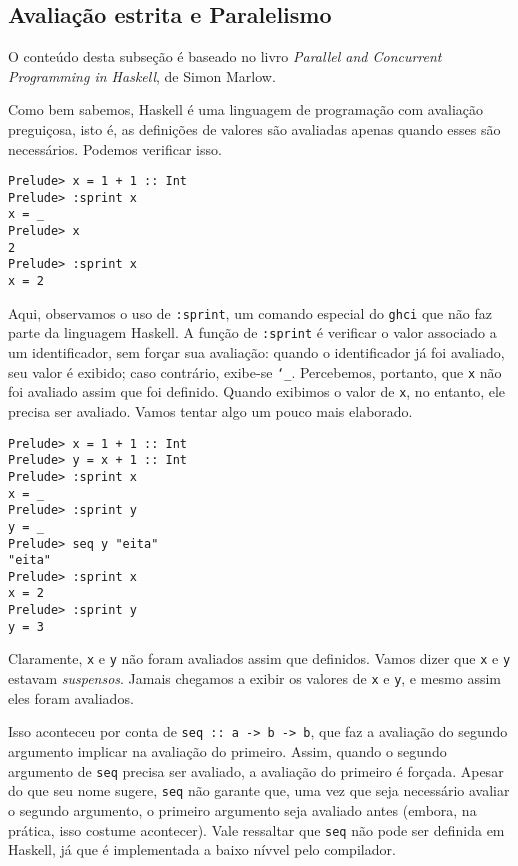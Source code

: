 \documentclass[a4paper]{article}
\begin{document}
\subsection{Avaliação estrita e Paralelismo}

\epigraph{O conteúdo desta subseção é baseado no livro \emph{Parallel and Concurrent Programming in Haskell}, de Simon Marlow.}{}

Como bem sabemos, Haskell é uma linguagem de programação com avaliação preguiçosa, isto é, as definições de valores são avaliadas apenas quando esses são necessários.
Podemos verificar isso.

\begin{verbatim}
Prelude> x = 1 + 1 :: Int
Prelude> :sprint x
x = _
Prelude> x
2
Prelude> :sprint x
x = 2
\end{verbatim}

Aqui, observamos o uso de \texttt{:sprint}, um comando especial do \texttt{ghci} que não faz parte da linguagem Haskell.
A função de \texttt{:sprint} é verificar o valor associado a um identificador, sem forçar sua avaliação: quando o identificador já foi avaliado, seu valor é exibido; caso contrário, exibe-se \texttt{\char`_}.
Percebemos, portanto, que \texttt{x} não foi avaliado assim que foi definido.
Quando exibimos o valor de \texttt{x}, no entanto, ele precisa ser avaliado.
Vamos tentar algo um pouco mais elaborado.

\begin{verbatim}
Prelude> x = 1 + 1 :: Int
Prelude> y = x + 1 :: Int
Prelude> :sprint x
x = _
Prelude> :sprint y
y = _
Prelude> seq y "eita"
"eita"
Prelude> :sprint x
x = 2
Prelude> :sprint y
y = 3
\end{verbatim}

Claramente, \texttt{x} e \texttt{y} não foram avaliados assim que definidos.
Vamos dizer que \texttt{x} e \texttt{y} estavam \emph{suspensos}.
Jamais chegamos a exibir os valores de \texttt{x} e \texttt{y}, e mesmo assim eles foram avaliados.

Isso aconteceu por conta de \texttt{seq :: a -> b -> b}, que faz a avaliação do segundo argumento implicar na avaliação do primeiro.
Assim, quando o segundo argumento de \texttt{seq} precisa ser avaliado, a avaliação do primeiro é forçada.
Apesar do que seu nome sugere, \texttt{seq} não garante que, uma vez que seja necessário avaliar o segundo argumento, o primeiro argumento seja avaliado antes (embora, na prática, isso costume acontecer).
Vale ressaltar que \texttt{seq} não pode ser definida em Haskell, já que é implementada a baixo nívvel pelo compilador.
\end{document}
